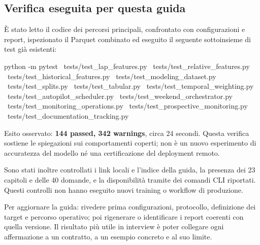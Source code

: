 \documentclass[11pt,a4paper]{article}
\newcommand{\code}[1]{{\ttfamily\small\seqsplit{#1}}}
\begin{document}
\subsection{Verifica eseguita per questa guida}\label{verifica-eseguita-per-questa-guida}

È stato letto il codice dei percorsi principali, confrontato con configurazioni e report, ispezionato il Parquet combinato ed eseguito il seguente sottoinsieme di test già esistenti:

\begin{CodeBlock}
python -m pytest \
  tests/test_lap_features.py \
  tests/test_relative_features.py \
  tests/test_historical_features.py \
  tests/test_modeling_dataset.py \
  tests/test_splits.py \
  tests/test_tabular.py \
  tests/test_temporal_weighting.py \
  tests/test_autopilot_scheduler.py \
  tests/test_weekend_orchestrator.py \
  tests/test_monitoring_operations.py \
  tests/test_prospective_monitoring.py \
  tests/test_documentation_tracking.py
\end{CodeBlock}

Esito osservato: \textbf{144 passed, 342 warnings}, circa 24 secondi. Questa verifica sostiene le spiegazioni sui comportamenti coperti; non è un nuovo esperimento di accuratezza del modello né una certificazione del deployment remoto.

Sono stati inoltre controllati i link locali e l'indice della guida, la presenza dei 23 capitoli e delle 40 domande, e la disponibilità tramite \code{--help} dei comandi CLI riportati. Questi controlli non hanno eseguito nuovi training o workflow di produzione.

Per aggiornare la guida: rivedere prima configurazioni, protocollo, definizione dei target e percorso operativo; poi rigenerare o identificare i report coerenti con quella versione. Il risultato più utile in interview è poter collegare ogni affermazione a un contratto, a un esempio concreto e al suo limite.
\end{document}
